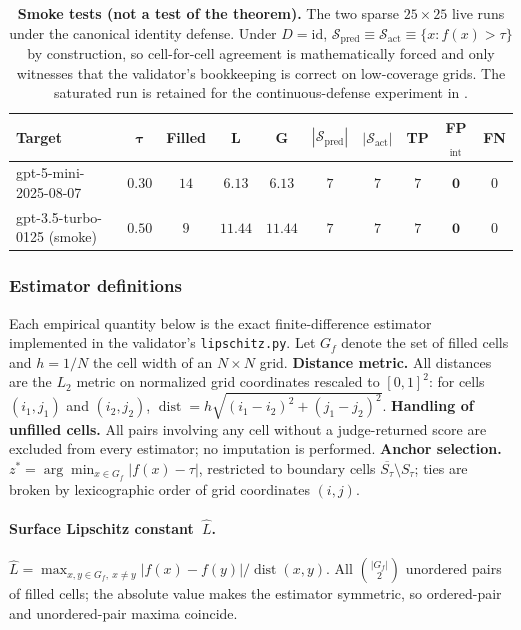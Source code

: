 \documentclass[11pt]{article}
\newcommand{\cl}[1]{\overline{#1}}
\newcommand{\dist}{\operatorname{dist}}
\begin{document}
\begin{table}[h]
\centering
\small
\caption{\textbf{Smoke tests (not a test of the theorem).} The
two sparse $25\times 25$ live runs under the canonical identity
defense. Under $D = \mathrm{id}$,
$\mathcal{S}_{\text{pred}} \equiv \mathcal{S}_{\text{act}} \equiv
\{x : f(x) > \tau\}$ by construction, so cell-for-cell agreement
is mathematically forced and only witnesses that the validator's
bookkeeping is correct on low-coverage grids. The saturated run
is retained for the continuous-defense experiment in
.}
\label{tab:smoketests}
\begin{tabular}{lccccccccc}
\toprule
\textbf{Target} & $\boldsymbol{\tau}$ & \textbf{Filled} & $\boldsymbol{L}$ & $\boldsymbol{G}$ & $|\mathcal{S}_{\text{pred}}|$ & $|\mathcal{S}_{\text{act}}|$ & \textbf{TP} & \textbf{FP}$_{\text{int}}$ & \textbf{FN} \\
\midrule
gpt-5-mini-2025-08-07           & $0.30$ & $14$  & $6.13$  & $6.13$  & $7$  & $7$  & $7$  & $\mathbf{0}$ & $0$ \\
gpt-3.5-turbo-0125 (smoke)      & $0.50$ & $9$   & $11.44$ & $11.44$ & $7$  & $7$  & $7$  & $\mathbf{0}$ & $0$ \\
\bottomrule
\end{tabular}
\end{table}

\subsubsection{Estimator definitions}
\label{sec:estimators}

Each empirical quantity below is the exact finite-difference
estimator implemented in the validator's \texttt{lipschitz.py}.
Let $G_{f}$ denote the set of filled cells and
$h = 1/N$ the cell width of an $N \times N$ grid.
\textbf{Distance metric.} All distances are the $L_{2}$ metric on
normalized grid coordinates rescaled to $[0,1]^{2}$: for cells
$(i_{1}, j_{1})$ and $(i_{2}, j_{2})$,
$\dist = h \sqrt{(i_{1} - i_{2})^{2} + (j_{1} - j_{2})^{2}}$.
\textbf{Handling of unfilled cells.} All pairs involving any cell
without a judge-returned score are excluded from every
estimator; no imputation is performed.
\textbf{Anchor selection.}
$z^{*} = \arg\min_{x \in G_{f}} \lvert f(x) - \tau \rvert$,
restricted to boundary cells $\cl{S_{\tau}} \setminus S_{\tau}$;
ties are broken by lexicographic order of grid coordinates
$(i, j)$.

\paragraph{Surface Lipschitz constant~$\hat L$.}
\(
  \hat L = \max_{x, y \in G_{f},\ x \neq y}
  \lvert f(x) - f(y) \rvert / \dist(x, y).
\)
All $\binom{|G_{f}|}{2}$ unordered pairs of filled cells; the
absolute value makes the estimator symmetric, so ordered-pair and
unordered-pair maxima coincide.
\end{document}
